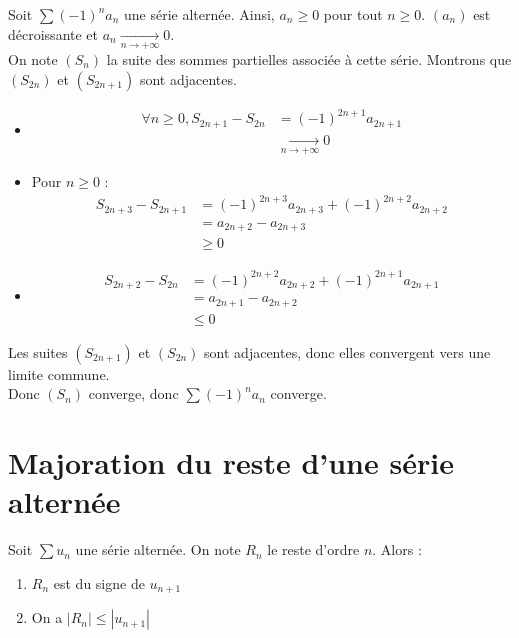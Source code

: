 \documentclass[../main.tex]{subfiles}
\begin{document}
\noindent Soit $\sum (-1)^n a_n$ une série alternée. Ainsi, $a_n \geq 0$ pour tout $n\geq 0$. $(a_n)$ est décroissante et $a_n \underset{n \to +\infty}{\longrightarrow} 0$. \\
On note $(S_n)$ la suite des sommes partielles associée à cette série. Montrons que $(S_{2n})$ et $(S_{2n + 1})$ sont adjacentes. 
\begin{itemize}
    \item \begin{align*}
        \forall n\geq 0, S_{2n+1} - S_{2n} &= (-1)^{2n+1} a_{2n+1}  \\
        &\underset{n \to +\infty}{\longrightarrow} 0
    \end{align*}
    \item Pour $n\geq 0$ : 
    \begin{align*}
        S_{2n+3} - S_{2n+1} &= (-1)^{2n+3} a_{2n+3} + (-1)^{2n+2} a_{2n+2} \\
        &= a_{2n+2} - a_{2n+3} \\
        &\geq 0
    \end{align*}
    \item \begin{align*}
        S_{2n+2} - S_{2n} &= (-1)^{2n+2} a_{2n+2} + (-1)^{2n+1} a_{2n+1} \\
        &= a_{2n+1} - a_{2n+2} \\
        &\leq 0
    \end{align*}
\end{itemize}
Les suites $(S_{2n+1})$ et $(S_{2n})$ sont adjacentes, donc elles convergent vers une limite commune. \\
Donc $(S_n)$ converge, donc $\sum (-1)^n a_n$ converge.

\section{Majoration du reste d'une série alternée}
\begin{tcolorbox}[title=Propostion 27.42, title filled=false, colframe=lightblue, colback=lightblue!10!white]
    Soit $\sum u_n$ une série alternée. On note $R_n$ le reste d'ordre $n$. Alors : 
    \begin{enumerate}
        \item $R_n$ est du signe de $u_{n+1}$
        \item On a $|R_n| \leq |u_{n+1}|$
    \end{enumerate}
\end{tcolorbox}
\end{document}

